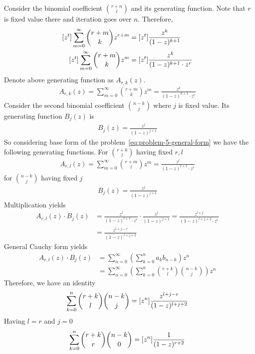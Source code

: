 Consider the binomial coefficient $\binom{r+n}{l}$ and its generating function.
Note that $r$ is fixed value there and iteration goes over $n$.
Therefore,
\begin{align*}
    \coefficientOf{z}{t} \sum_{m=0}^{\infty} \binom{r+m}{k} z^{r+m} &= \coefficientOf{z}{t} \frac{z^k}{(1-z)^{k+1}} \\
    \coefficientOf{z}{t} \sum_{m=0}^{\infty} \binom{r+m}{k} z^{m}   &= \coefficientOf{z}{t} \frac{z^k}{(1-z)^{k+1} \cdot z^r}
\end{align*}
Denote above generating function as $A_{r,k}(z)$.
\begin{align*}
    A_{r,k}(z) = \sum_{m=0}^{\infty} \binom{r+m}{k} z^{m} = \frac{z^k}{(1-z)^{k+1} \cdot z^r}
\end{align*}
Consider the second binomial coefficient $\binom{n-k}{j}$ where $j$ is fixed value.
Its generating function $B_j(z)$ is
\begin{align*}
    B_j(z) = \frac{z^j}{(1-z)^{j+1}}
\end{align*}
So considering base form of the problem~\eqref{eq:problem-5-general-form} we have the following generating functions.
For $\binom{r+k}{l}$ having fixed $r, l$
\begin{align*}
    A_{r,l}(z) = \sum_{m=0}^{\infty} \binom{r+m}{l} z^{m} = \frac{z^l}{(1-z)^{l+1} \cdot z^r}
\end{align*}
for $\binom{n-k}{j}$ having fixed $j$
\begin{align*}
    B_j(z) = \frac{z^j}{(1-z)^{j+1}}
\end{align*}
Multiplication yields
\begin{align*}
    A_{r,l}(z) \cdot B_j(z) &= \frac{z^l}{(1-z)^{l+1} \cdot z^r} \cdot \frac{z^j}{(1-z)^{j+1}}
    = \frac{z^{l+j}}{(1-z)^{l+j+2} \cdot z^r} \\
    &= \frac{z^{l+j-r}}{(1-z)^{l+j+2}}
\end{align*}
General Cauchy form yields
\begin{align*}
    A_{r,l}(z) \cdot B_j(z) &= \sum_{n=0}^{\infty} \left( \sum_{k=0}^{n} a_k b_{n-k} \right) z^n \\
    &= \sum_{n=0}^{\infty} \left( \sum_{k=0}^{n} \binom{r+k}{l} \binom{n-k}{j} \right) z^n
\end{align*}
Therefore, we have an identity
\begin{align*}
    \sum_{k=0}^{n} \binom{r+k}{l} \binom{n-k}{j} = [z^{n}] \frac{z^{l+j-r}}{(1-z)^{l+j+2}}
\end{align*}
Having $l=r$ and $j=0$
\begin{align*}
    \sum_{k=0}^{n} \binom{r+k}{r} \binom{n-k}{0} = [z^{n}] \frac{1}{(1-z)^{r+2}}
\end{align*}
